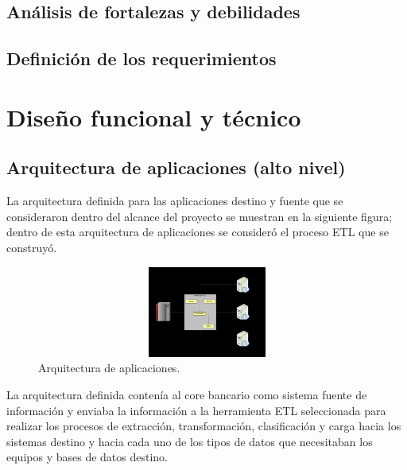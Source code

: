 \documentclass[a4paper,openright,12pt]{book}
\begin{document}
\section{Análisis de fortalezas y debilidades}

\section{Definición de los requerimientos}

\chapter*{Diseño funcional y técnico}
\label{cap.diseno}

\section{Arquitectura de aplicaciones (alto nivel)}

La arquitectura definida para las aplicaciones destino y fuente que se
consideraron dentro del alcance del proyecto se muestran en la siguiente figura;
dentro de esta arquitectura de aplicaciones se consideró el proceso ETL que se
construyó.

\begin{figure}[htb]
  \begin{center}
    \includegraphics[width=12cm, height=3cm, scale=0.5]{Arquitectura.jpg}
        \caption{Arquitectura de aplicaciones.}
    \label{fig:arquitectura}
  \end{center}
\end{figure}

La arquitectura definida contenía al core bancario como sistema fuente de
información y enviaba la información a la herramienta ETL seleccionada para
realizar los procesos de extracción, transformación, clasificación y carga hacia
los sistemas destino y hacia cada uno de los tipos de datos que necesitaban los
equipos y bases de datos destino.
\end{document}
